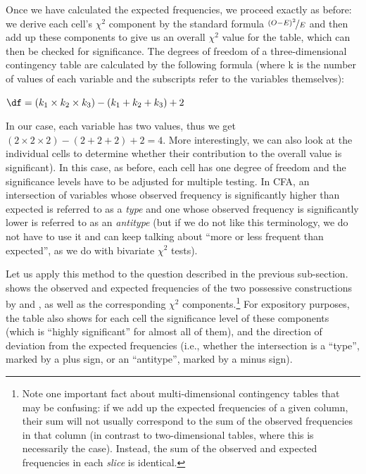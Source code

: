 Once we have calculated the expected  frequencies, we proceed exactly as before: we derive each cell's $\chi^2$  component by the standard formula $\nicefrac{(O - E)^2}{E}$ and then add up these components to give us an overall $\chi^2$ value for the table, which can then be checked for significance.  The degrees of freedom of a three\hyp{}dimensional contingency  table are calculated by the following formula (where k is the number of values of each variable and the subscripts refer to the variables themselves):

\begin{exe}
\ex
$\df = (k_1 \times k_2 \times k_3) - (k_1 + k_2 + k_3) + 2$
\label{ex:degreesoffreedom3D}
\end{exe}

In our case, each variable has two values, thus we get $(2 \times 2 \times 2) - (2 + 2 + 2) + 2 = 4$. More interestingly, we can also look at the individual cells to determine whether their contribution to the overall value is significant).  In this case, as before, each cell has one degree of freedom and the significance levels have to be adjusted for multiple testing. In CFA,  an intersection of variables whose observed frequency  is significantly higher than expected  is referred to as a \textit{type}  and one whose observed frequency is significantly lower is referred to as an \textit{antitype}  (but if we do not like this terminology, we do not have to use it and can keep talking about ``more or less frequent than expected'',  as we do with bivariate  $\chi^2$  tests).

Let us apply this method to the question described in the previous sub\hyp{}section.  shows the observed and expected  frequencies of the two possessive  constructions by  and , as well as the corresponding $\chi^2$  components.\footnote{Note one important fact about multi\hyp{}dimensional contingency  tables that may be confusing: if we add up the expected  frequencies of a given column, their sum will not usually correspond to the sum of the observed frequencies  in that column (in contrast to two\hyp{}dimensional tables, where this is necessarily the case). Instead, the sum of the observed and expected frequencies in each \textit{slice} is identical.} For expository purposes, the table also shows for each cell the significance  level of these components (which is ``highly significant'' for almost all of them), and the direction of deviation from the expected  frequencies (i.e., whether the intersection is a ``type'',  marked  by a plus sign, or an ``antitype'',  marked by a minus sign).

